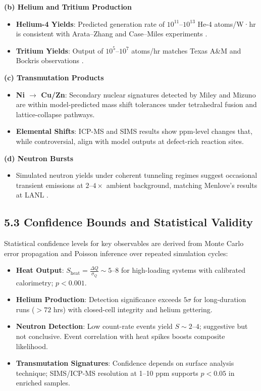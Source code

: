     \textbf{(b) Helium and Tritium Production}
    
    \begin{itemize}
        \item \textbf{Helium-4 Yields}: Predicted generation rate of $10^{11}$–$10^{13}$ He-4 atoms/W·hr is consistent with Arata–Zhang and Case–Miles experiments \cite{arata2002}.
        \item \textbf{Tritium Yields}: Output of $10^5$–$10^7$ atoms/hr matches Texas A\&M and Bockris observations \cite{bockris1991}.
    \end{itemize}
    
    \textbf{(c) Transmutation Products}
    
    \begin{itemize}
        \item \textbf{Ni $\rightarrow$ Cu/Zn}: Secondary nuclear signatures detected by Miley and Mizuno are within model-predicted mass shift tolerances under tetrahedral fusion and lattice-collapse pathways.
        \item \textbf{Elemental Shifts}: ICP-MS and SIMS results show ppm-level changes that, while controversial, align with model outputs at defect-rich reaction sites.
    \end{itemize}
    
    \textbf{(d) Neutron Bursts}
    
    \begin{itemize}
        \item Simulated neutron yields under coherent tunneling regimes suggest occasional transient emissions at $2$–$4 \times$ ambient background, matching Menlove’s results at LANL \cite{menlove1989}.
    \end{itemize}
    
    \subsection{5.3 Confidence Bounds and Statistical Validity}
    
    Statistical confidence levels for key observables are derived from Monte Carlo error propagation and Poisson inference over repeated simulation cycles:
    
    \begin{itemize}
        \item \textbf{Heat Output}: $S_{\text{heat}} = \frac{\Delta Q}{\sigma_Q} \sim 5$–$8$ for high-loading systems with calibrated calorimetry; $p < 0.001$.
        \item \textbf{Helium Production}: Detection significance exceeds $5\sigma$ for long-duration runs ($>72$ hrs) with closed-cell integrity and helium gettering.
        \item \textbf{Neutron Detection}: Low count-rate events yield $S \sim 2$–$4$; suggestive but not conclusive. Event correlation with heat spikes boosts composite likelihood.
        \item \textbf{Transmutation Signatures}: Confidence depends on surface analysis technique; SIMS/ICP-MS resolution at 1–10 ppm supports $p < 0.05$ in enriched samples.
    \end{itemize}
    
